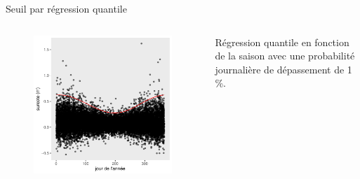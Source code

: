 \documentclass[aspectratio=169]{beamer}
\begin{document}
\begin{frame}{Seuil par régression quantile}
\begin{columns}
	\begin{column}{0.4\textwidth}
		\begin{figure}
		\vspace{-0.4cm}
	 		\includegraphics[height=0.85\textheight, center]{../figures/points.pdf}
		\end{figure}
	\end{column}
	\begin{column}{0.6\textwidth}
	Régression quantile en fonction de la saison avec une probabilité journalière de dépassement de 1 \%.
	\end{column}
\end{columns}
\end{frame}
\end{document}
